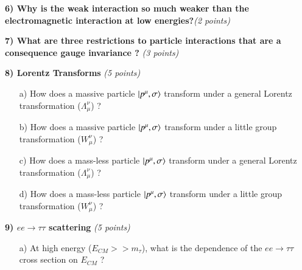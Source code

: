 {\vspace{2in}


\textbf{6) Why is the weak interaction so much weaker than the electromagnetic interaction at low energies?}\hfill \textit{(2 points)}\\

\vspace{2in}


\textbf{7) What are three restrictions to particle interactions that are a consequence gauge invariance ? }\hfill \textit{(3 points)}\\


\vspace{2in}

\clearpage

\textbf{8) Lorentz Transforms } \hfill \textit{(5 points)}\\
\begin{itemize}
\item[a)] How does a massive particle $\ket{p^\mu,\sigma}$ transform under a general Lorentz transformation ($\Lambda_\mu^\nu$)  ?
\vspace*{1in}
\item[b)] How does a massive particle $\ket{p^\mu,\sigma}$ transform under a little group transformation ($W_\mu^\nu$)  ?
\vspace*{1in}
\item[c)] How does a mass-less particle $\ket{p^\mu,\sigma}$ transform under a general Lorentz transformation ($\Lambda_\mu^\nu$)  ?
\vspace*{1in}
\item[d)] How does a mass-less particle $\ket{p^\mu,\sigma}$ transform under a little group transformation ($W_\mu^\nu$)  ?
\vspace*{1in}
\end{itemize}




\clearpage

\textbf{9) $ee\rightarrow\tau\tau$ scattering } \hfill \textit{(5 points)}\\
\begin{itemize}
\item[a)]{
At high energy ($E_{CM} >> m_\tau$), what is the dependence of the $ee\rightarrow\tau\tau$ cross section on $E_{CM}$ ?
\vspace*{1in}
}



\end{itemize}}
